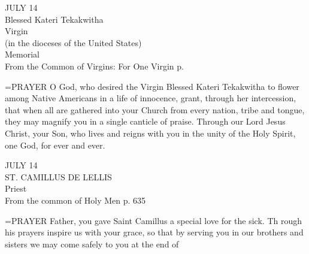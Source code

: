 \begin{center}\normalsize JULY 14 \\
\footnotesize Blessed Kateri Tekakwitha\\
\footnotesize Virgin\\
\footnotesize (in the dioceses of the United States)\\
\footnotesize Memorial\\
\footnotesize From the Common of Virgins: For One Virgin p.\\
\end{center}

\hangindent=\parindent \small{PRAYER 
O God, who desired the Virgin Blessed Kateri Tekakwitha
to flower among Native Americans
in a life of innocence,
grant, through her intercession,
that when all are gathered into your Church
from every nation, tribe and tongue,
they may magnify you
in a single canticle of praise.
Through our Lord Jesus Christ, your Son,
who lives and reigns with you in the unity of the Holy Spirit,
one God, for ever and ever.\\}
 
\begin{center}\normalsize JULY 14\\
\footnotesize ST. CAMILLUS DE LELLIS\\
\footnotesize Priest\\
\footnotesize From the common of Holy Men p. 635\\
\end{center}

\hangindent=\parindent \small{PRAYER  
Father, you gave Saint Camillus a special love for the sick.
Th rough his prayers inspire us with your grace, so that by serving you
in our brothers and sisters we may come safely to you at the end of\\}
 
